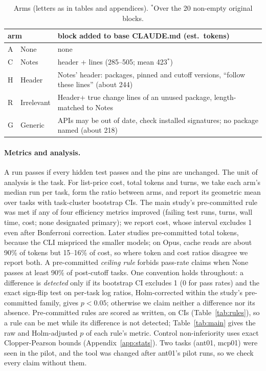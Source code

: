 \documentclass[11pt]{article}
\newcommand{\aNone}{\textsf{None}\xspace}
\newcommand{\aNotes}{\textsf{Notes}\xspace}
\newcommand{\aHeader}{\textsf{Header}\xspace}
\newcommand{\aIrr}{\textsf{Irrelevant}\xspace}
\newcommand{\aGen}{\textsf{Generic}\xspace}
\begin{document}
\begin{table}[t]
\centering
\footnotesize
\setlength{\tabcolsep}{2pt}
\begin{tabular}{ll>{\raggedright\arraybackslash}p{}}
\toprule
\multicolumn{2}{l}{arm} & block added to base CLAUDE.md (est.\ tokens) \\
\midrule
A & \aNone & none \\
C & \aNotes & header + lines (285--505; mean 423$^{*}$) \\
H & \aHeader & \aNotes' header: packages, pinned and cutoff versions, ``follow these lines'' (about 244) \\
R & \aIrr & \aHeader + true change lines of an unused package, length-matched to \aNotes \\
G & \aGen & APIs may be out of date, check installed signatures; no package named (about 218) \\
\bottomrule
\end{tabular}
\caption{Arms (letters as in tables and appendices). $^{*}$Over the 20 non-empty original blocks.}
\label{tab:conditions}
\end{table}

\paragraph{Metrics and analysis.}
A run passes if every hidden test passes and the pins are unchanged. The unit of analysis is the task.
For list-price cost, total tokens and turns, we take each arm's median run per task, form the ratio between arms, and report its geometric mean over tasks with task-cluster bootstrap CIs.
The main study's pre-committed rule was met if any of four efficiency metrics improved (failing test runs, turns, wall time, cost; none designated primary); we report cost, whose interval excludes 1 even after Bonferroni correction.
Later studies pre-committed total tokens, because the CLI mispriced the smaller models; on Opus, cache reads are about 90\% of tokens but 15--16\% of cost, so where token and cost ratios disagree we report both.
A pre-committed \emph{ceiling rule} forbids pass-rate claims when \aNone passes at least 90\% of post-cutoff tasks.
One convention holds throughout: a difference is \emph{detected} only if its bootstrap CI excludes 1 (0 for pass rates) and the exact sign-flip test on per-task log ratios, Holm-corrected within the study's pre-committed family, gives $p<0.05$; otherwise we claim neither a difference nor its absence. Pre-committed rules are scored as written, on CIs (Table~\ref{tab:rules}), so a rule can be met while its difference is not detected; Table~\ref{tab:main} gives the raw and Holm-adjusted $p$ of each rule's metric. Control non-inferiority uses exact Clopper-Pearson bounds (Appendix~\ref{app:stats}).
Two tasks (ant01, mcp01) were seen in the pilot, and the tool was changed after ant01's pilot runs, so we check every claim without them.
\end{document}
